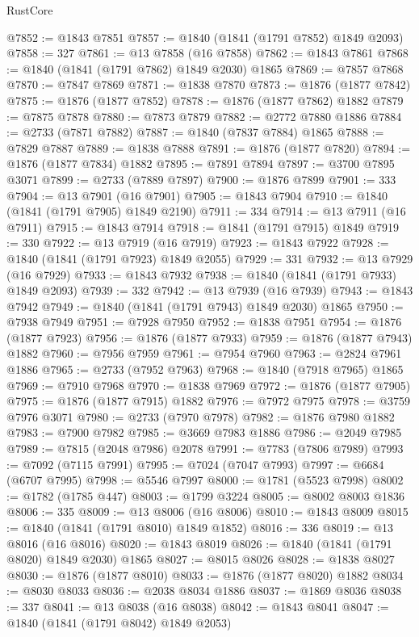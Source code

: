 \begin{lexlean}{RustCore}
\begin{coremodule}
@7852 := @1843 @7851
@7857 := @1840 (@1841 (@1791 @7852) @1849 @2093)
@7858 := 327
@7861 := @13 @7858 (@16 @7858)
@7862 := @1843 @7861
@7868 := @1840 (@1841 (@1791 @7862) @1849 @2030) @1865
@7869 := @7857 @7868
@7870 := @7847 @7869
@7871 := @1838 @7870
@7873 := @1876 (@1877 @7842)
@7875 := @1876 (@1877 @7852)
@7878 := @1876 (@1877 @7862) @1882
@7879 := @7875 @7878
@7880 := @7873 @7879
@7882 := @2772 @7880 @1886
@7884 := @2733 (@7871 @7882)
@7887 := @1840 (@7837 @7884) @1865
@7888 := @7829 @7887
@7889 := @1838 @7888
@7891 := @1876 (@1877 @7820)
@7894 := @1876 (@1877 @7834) @1882
@7895 := @7891 @7894
@7897 := @3700 @7895 @3071
@7899 := @2733 (@7889 @7897)
@7900 := @1876 @7899
@7901 := 333
@7904 := @13 @7901 (@16 @7901)
@7905 := @1843 @7904
@7910 := @1840 (@1841 (@1791 @7905) @1849 @2190)
@7911 := 334
@7914 := @13 @7911 (@16 @7911)
@7915 := @1843 @7914
@7918 := @1841 (@1791 @7915) @1849
@7919 := 330
@7922 := @13 @7919 (@16 @7919)
@7923 := @1843 @7922
@7928 := @1840 (@1841 (@1791 @7923) @1849 @2055)
@7929 := 331
@7932 := @13 @7929 (@16 @7929)
@7933 := @1843 @7932
@7938 := @1840 (@1841 (@1791 @7933) @1849 @2093)
@7939 := 332
@7942 := @13 @7939 (@16 @7939)
@7943 := @1843 @7942
@7949 := @1840 (@1841 (@1791 @7943) @1849 @2030) @1865
@7950 := @7938 @7949
@7951 := @7928 @7950
@7952 := @1838 @7951
@7954 := @1876 (@1877 @7923)
@7956 := @1876 (@1877 @7933)
@7959 := @1876 (@1877 @7943) @1882
@7960 := @7956 @7959
@7961 := @7954 @7960
@7963 := @2824 @7961 @1886
@7965 := @2733 (@7952 @7963)
@7968 := @1840 (@7918 @7965) @1865
@7969 := @7910 @7968
@7970 := @1838 @7969
@7972 := @1876 (@1877 @7905)
@7975 := @1876 (@1877 @7915) @1882
@7976 := @7972 @7975
@7978 := @3759 @7976 @3071
@7980 := @2733 (@7970 @7978)
@7982 := @1876 @7980 @1882
@7983 := @7900 @7982
@7985 := @3669 @7983 @1886
@7986 := @2049 @7985
@7989 := @7815 (@2048 @7986) @2078
@7991 := @7783 (@7806 @7989)
@7993 := @7092 (@7115 @7991)
@7995 := @7024 (@7047 @7993)
@7997 := @6684 (@6707 @7995)
@7998 := @5546 @7997
@8000 := @1781 (@5523 @7998)
@8002 := @1782 (@1785 @447)
@8003 := @1799 @3224
@8005 := @8002 @8003 @1836
@8006 := 335
@8009 := @13 @8006 (@16 @8006)
@8010 := @1843 @8009
@8015 := @1840 (@1841 (@1791 @8010) @1849 @1852)
@8016 := 336
@8019 := @13 @8016 (@16 @8016)
@8020 := @1843 @8019
@8026 := @1840 (@1841 (@1791 @8020) @1849 @2030) @1865
@8027 := @8015 @8026
@8028 := @1838 @8027
@8030 := @1876 (@1877 @8010)
@8033 := @1876 (@1877 @8020) @1882
@8034 := @8030 @8033
@8036 := @2038 @8034 @1886
@8037 := @1869 @8036
@8038 := 337
@8041 := @13 @8038 (@16 @8038)
@8042 := @1843 @8041
@8047 := @1840 (@1841 (@1791 @8042) @1849 @2053)

\end{coremodule}
\end{lexlean}
